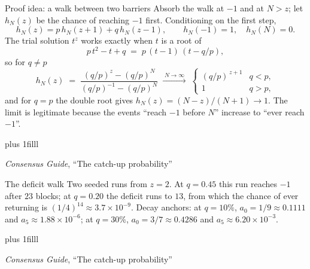 \documentclass[aspectratio=169,11pt]{beamer}
\newcommand{\src}[1]{\par\vskip0pt plus 1filll
  {\fontsize{6}{7.2}\selectfont\color{arbdim}\raggedright #1\par}}
\begin{document}
\begin{frame}{Proof idea: a walk between two barriers}
Absorb the walk at $-1$ and at $N > z$; let $h_N(z)$ be the chance of
reaching $-1$ first. Conditioning on the first step,
\[
  h_N(z) = p\, h_N(z+1) + q\, h_N(z-1), \qquad
  h_N(-1) = 1,\quad h_N(N) = 0 .
\]
The trial solution $t^{z}$ works exactly when $t$ is a root of
\[
  p\,t^{2} - t + q \;=\; p\,(t - 1)\,(t - q/p),
\]
so for $q \neq p$
\[
  h_N(z) \;=\; \frac{(q/p)^{z} - (q/p)^{N}}{(q/p)^{-1} - (q/p)^{N}}
  \;\xrightarrow{\;N \to \infty\;}\;
  \begin{cases}
    (q/p)^{\,z+1} & q < p,\\
    1 & q > p,
  \end{cases}
\]
and for $q = p$ the double root gives $h_N(z) = (N - z)/(N + 1) \to 1$.
The limit is legitimate because the events ``reach $-1$ before $N$''
increase to ``ever reach $-1$''.
\src{\emph{Consensus Guide}, ``The catch-up probability''}
\end{frame}

\begin{frame}{The deficit walk}
\Kwalk
\vspace{-8pt}
Two seeded runs from $z = 2$. At $q = 0.45$ this run reaches $-1$ after
$23$ blocks; at $q = 0.20$ the deficit runs to $13$, from which the
chance of ever returning is $(1/4)^{14} \approx 3.7 \times 10^{-9}$.
Decay anchors: at $q = 10\%$, $a_0 = 1/9 \approx 0.1111$ and
$a_5 \approx 1.88 \times 10^{-6}$; at $q = 30\%$, $a_0 = 3/7 \approx
0.4286$ and $a_5 \approx 6.20 \times 10^{-3}$.
\src{\emph{Consensus Guide}, ``The catch-up probability''}
\end{frame}
\end{document}
